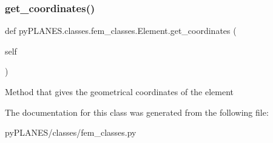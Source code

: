 \subsubsection{\texorpdfstring{get\+\_\+coordinates()}{get\_coordinates()}}
{\footnotesize\ttfamily def py\+P\+L\+A\+N\+E\+S.\+classes.\+fem\+\_\+classes.\+Element.\+get\+\_\+coordinates (\begin{DoxyParamCaption}\item[{}]{self }\end{DoxyParamCaption})}

\begin{DoxyVerb}Method that gives the geometrical coordinates of the element\end{DoxyVerb}
 

The documentation for this class was generated from the following file\+:\begin{DoxyCompactItemize}
\item 
py\+P\+L\+A\+N\+E\+S/classes/fem\+\_\+classes.\+py\end{DoxyCompactItemize}
